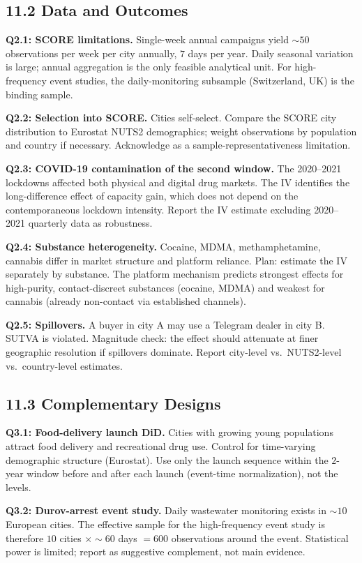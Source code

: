 \documentclass[11pt,a4paper]{article}
\begin{document}
\subsection*{11.2 Data and Outcomes}

\textbf{Q2.1: SCORE limitations.} Single-week annual campaigns yield $\sim 50$ observations per week per city annually, $7$ days per year. Daily seasonal variation is large; annual aggregation is the only feasible analytical unit. For high-frequency event studies, the daily-monitoring subsample (Switzerland, UK) is the binding sample.

\textbf{Q2.2: Selection into SCORE.} Cities self-select. Compare the SCORE city distribution to Eurostat NUTS2 demographics; weight observations by population and country if necessary. Acknowledge as a sample-representativeness limitation.

\textbf{Q2.3: COVID-19 contamination of the second window.} The 2020--2021 lockdowns affected both physical and digital drug markets. The IV identifies the long-difference effect of capacity gain, which does not depend on the contemporaneous lockdown intensity. Report the IV estimate excluding 2020--2021 quarterly data as robustness.

\textbf{Q2.4: Substance heterogeneity.} Cocaine, MDMA, methamphetamine, cannabis differ in market structure and platform reliance. Plan: estimate the IV separately by substance. The platform mechanism predicts strongest effects for high-purity, contact-discreet substances (cocaine, MDMA) and weakest for cannabis (already non-contact via established channels).

\textbf{Q2.5: Spillovers.} A buyer in city A may use a Telegram dealer in city B. SUTVA is violated. Magnitude check: the effect should attenuate at finer geographic resolution if spillovers dominate. Report city-level vs.\ NUTS2-level vs.\ country-level estimates.

\subsection*{11.3 Complementary Designs}

\textbf{Q3.1: Food-delivery launch DiD.} Cities with growing young populations attract food delivery and recreational drug use. Control for time-varying demographic structure (Eurostat). Use only the launch sequence within the $2$-year window before and after each launch (event-time normalization), not the levels.

\textbf{Q3.2: Durov-arrest event study.} Daily wastewater monitoring exists in $\sim 10$ European cities. The effective sample for the high-frequency event study is therefore $10$ cities $\times \sim 60$ days $= 600$ observations around the event. Statistical power is limited; report as suggestive complement, not main evidence.
\end{document}
